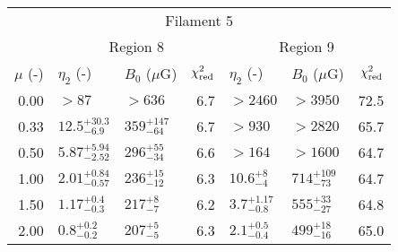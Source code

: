 \begin{tabular}{@{}rllrllr@{}}
\midrule
\multicolumn{7}{c}{Filament 5} \\
\cmidrule{1-7}
{} & \multicolumn{3}{c}{Region 8\tablenotemark{a}}
   & \multicolumn{3}{c}{Region 9} \\
\cmidrule(lr){2-4} \cmidrule(l){5-7}
$\mu$ (-) & $\eta_2$ (-) & $B_0$ ($\mu$G) & $\chi^2_{\mathrm{red}}$
          & $\eta_2$ (-) & $B_0$ ($\mu$G) & $\chi^2_{\mathrm{red}}$ \\
\cmidrule{1-7}
0.00 & $>87$ & $>636$ & 6.7
     & $>2460$ & $>3950$ & 72.5 \\
0.33 & ${12.5}^{+30.3}_{-6.9}$ & ${359}^{+147}_{-64}$ & 6.7
     & $>930$ & $>2820$ & 65.7 \\
0.50 & ${5.87}^{+5.94}_{-2.52}$ & ${296}^{+55}_{-34}$ & 6.6
     & $>164$ & $>1600$ & 64.7 \\
1.00 & ${2.01}^{+0.84}_{-0.57}$ & ${236}^{+15}_{-12}$ & 6.3
     & ${10.6}^{+8}_{-4}$ & ${714}^{+109}_{-73}$ & 64.7 \\
1.50 & ${1.17}^{+0.4}_{-0.3}$ & ${217}^{+8}_{-7}$ & 6.2
     & ${3.7}^{+1.17}_{-0.8}$ & ${555}^{+33}_{-27}$ & 64.8 \\
2.00 & ${0.8}^{+0.2}_{-0.2}$ & ${207}^{+5}_{-5}$ & 6.3
     & ${2.1}^{+0.5}_{-0.4}$ & ${499}^{+18}_{-16}$ & 65.0 \\
\bottomrule
\end{tabular}
